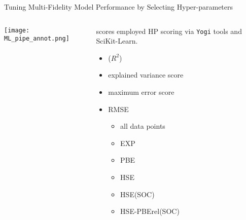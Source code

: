 \documentclass[10pt, aspectratio=169, presentation]{beamer}
\begin{document}
\begin{frame}[label={sec:org09b4d28},fragile]{Tuning Multi-Fidelity Model Performance by Selecting Hyper-parameters}
 \begin{columns}
\begin{column}{0.7\columnwidth}
\begin{center}
\texttt{[image: ML\_pipe\_annot.png]}
\end{center}
\end{column}

\begin{column}{0.3\columnwidth}
\begin{block}{scores employed}
HP scoring via \texttt{Yogi} tools and SciKit-Learn\autocite{manganaris-2022-mrs-comput}.
\begin{itemize}
\item (\(R^2\))
\item explained variance score
\item maximum error score
\item RMSE
\begin{itemize}
\item all data points
\item EXP
\item PBE
\item HSE
\item HSE(SOC)
\item HSE-PBErel(SOC)
\end{itemize}
\end{itemize}
\end{block}
\end{column}
\end{columns}
\end{frame}
\end{document}
